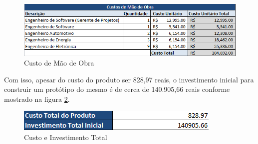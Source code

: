 \begin{figure}[H]
		\centering
			\includegraphics[scale=1.0]{figuras/customao.png}
		\caption{Custo de Mão de Obra}
		\label{customao}
\end{figure}

Com isso, apesar do custo do produto ser 828,97 reais, o investimento inicial para construir um protótipo do mesmo é de cerca de 140.905,66 reais conforme mostrado na figura \ref{investimento}.

\begin{figure}[H]
		\centering
			\includegraphics[scale=1.0]{figuras/investimento.png}
		\caption{Custo e Investimento Total}
		\label{investimento}
\end{figure}